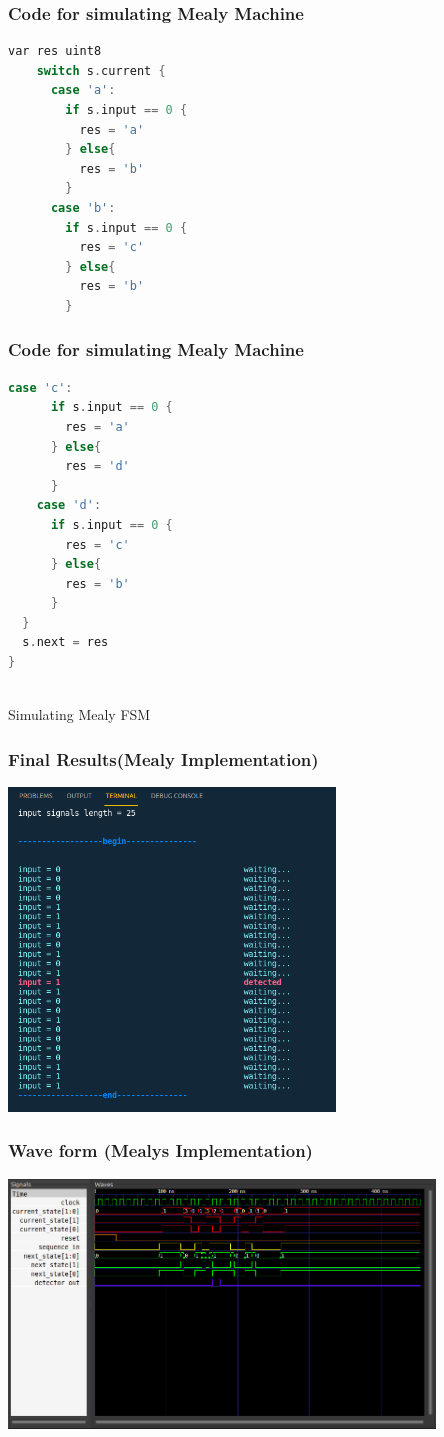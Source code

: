 \documentclass[xcolor=table]{beamer}
\begin{document}
\begin{frame}[fragile]
  \frametitle{Code for simulating Mealy Machine}
\begin{lstlisting}[language=C,keywordstyle=\bf,stringstyle=\it]
    var res uint8 
    switch s.current {
      case 'a':
        if s.input == 0 {
          res = 'a'
        } else{
          res = 'b'
        }
      case 'b':
        if s.input == 0 {
          res = 'c'
        } else{
          res = 'b'
        }

\end{lstlisting}
\end{frame}

\begin{frame}[fragile]
  \frametitle{Code for simulating Mealy Machine}
\begin{lstlisting}[language=C,keywordstyle=\bf,stringstyle=\it]
    case 'c':
      if s.input == 0 {
        res = 'a'
      } else{
        res = 'd'
      }
    case 'd':
      if s.input == 0 {
        res = 'c'
      } else{
        res = 'b'
      }
  }
  s.next = res
}
  
  \end{lstlisting}
\end{frame}


\begin{frame}{Simulating Mealy FSM}
\end{frame}


\begin{frame}
  \frametitle{Final Results(Mealy Implementation)}
  \centering
  \includegraphics[width=0.65\textwidth, height=0.85\textheight]{./static/res_mealy_sim.png}
\end{frame}


\begin{frame}
  \frametitle{Wave form (Mealys Implementation)}
  \centering
  \includegraphics[width=0.85\textwidth, height=0.65\textheight]{./static/res_wave_mealy.png}
\end{frame}
\end{document}

